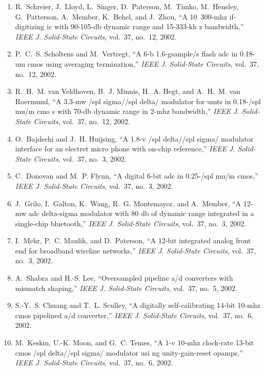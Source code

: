 \begin{enumerate}
\item
R.~Schreier, J.~Lloyd, L.~Singer, D.~Paterson, M.~Timko, M.~Hensley,
  G.~Patterson, A.~Member, K.~Behel, and J.~Zhou, ``A 10~300-mhz if-digitizing
  ic with 90-105-db dynamic range and 15-333-kh z bandwidth,'' \emph{{IEEE} J.
  Solid-State Circuits}, vol.~37, no.~12, 2002.

\item
P.~C.~S. Scholtens and M.~Vertregt, ``A 6-b 1.6-gsample/s flash adc in 0.18-um
  cmos using averaging termination,'' \emph{{IEEE} J. Solid-State Circuits},
  vol.~37, no.~12, 2002.

\item
R.~H.~M. van Veldhoven, B.~J. Minnis, H.~A. Hegt, and A.~H.~M. van Roermund,
  ``A 3.3-mw /spl sigma//spl delta/ modulator for umts in 0.18-/spl mu/m cmo s
  with 70-db dynamic range in 2-mhz bandwidth,'' \emph{{IEEE} J. Solid-State
  Circuits}, vol.~37, no.~12, 2002.

\item
O.~Bajdechi and J.~H. Huijsing, ``A 1.8-v /spl delta//spl sigma/ modulator
  interface for an electret micro phone with on-chip reference,'' \emph{{IEEE}
  J. Solid-State Circuits}, vol.~37, no.~3, 2002.

\item
C.~Donovan and M.~P. Flynn, ``A digital 6-bit adc in 0.25-/spl mu/m cmos,''
  \emph{{IEEE} J. Solid-State Circuits}, vol.~37, no.~3, 2002.

\item
J.~Grilo, I.~Galton, K.~Wang, R.~G. Montemayor, and A.~Member, ``A 12-mw adc
  delta-sigma modulator with 80 db of dynamic range integrated in a single-chip
  bluetooth,'' \emph{{IEEE} J. Solid-State Circuits}, vol.~37, no.~3, 2002.

\item
I.~Mehr, P.~C. Maulik, and D.~Paterson, ``A 12-bit integrated analog front end
  for broadband wireline networks,'' \emph{{IEEE} J. Solid-State Circuits},
  vol.~37, no.~3, 2002.

\item
A.~Shabra and H.-S. Lee, ``Oversampled pipeline a/d converters with mismatch
  shaping,'' \emph{{IEEE} J. Solid-State Circuits}, vol.~37, no.~5, 2002.

\item
S.-Y.~S. Chuang and T.~L. Sculley, ``A digitally self-calibrating 14-bit 10-mhz
  cmos pipelined a/d converter,'' \emph{{IEEE} J. Solid-State Circuits},
  vol.~37, no.~6, 2002.

\item
M.~Keskin, U.-K. Moon, and G.~C. Temes, ``A 1-v 10-mhz clock-rate 13-bit cmos
  /spl delta//spl sigma/ modulator usi ng unity-gain-reset opamps,''
  \emph{{IEEE} J. Solid-State Circuits}, vol.~37, no.~6, 2002.


\end{enumerate}
